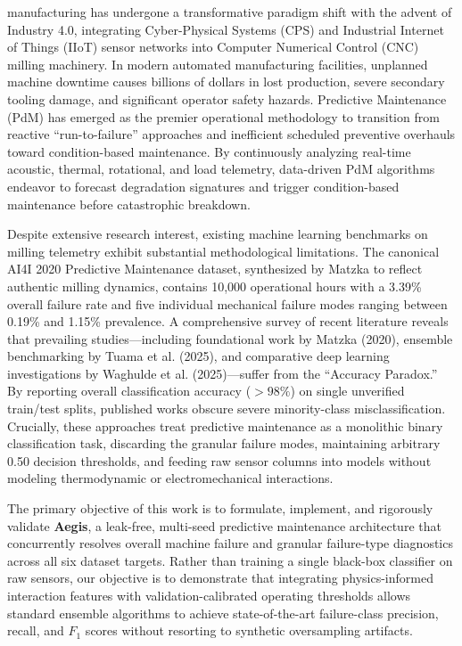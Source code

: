 \documentclass[conference]{IEEEtran}
\begin{document}
 manufacturing has undergone a transformative paradigm shift with the advent of Industry 4.0, integrating Cyber-Physical Systems (CPS) and Industrial Internet of Things (IIoT) sensor networks into Computer Numerical Control (CNC) milling machinery. In modern automated manufacturing facilities, unplanned machine downtime causes billions of dollars in lost production, severe secondary tooling damage, and significant operator safety hazards. Predictive Maintenance (PdM) has emerged as the premier operational methodology to transition from reactive ``run-to-failure'' approaches and inefficient scheduled preventive overhauls toward condition-based maintenance. By continuously analyzing real-time acoustic, thermal, rotational, and load telemetry, data-driven PdM algorithms endeavor to forecast degradation signatures and trigger condition-based maintenance before catastrophic breakdown.

Despite extensive research interest, existing machine learning benchmarks on milling telemetry exhibit substantial methodological limitations. The canonical AI4I 2020 Predictive Maintenance dataset, synthesized by Matzka to reflect authentic milling dynamics, contains 10,000 operational hours with a 3.39\% overall failure rate and five individual mechanical failure modes ranging between 0.19\% and 1.15\% prevalence. A comprehensive survey of recent literature reveals that prevailing studies—including foundational work by Matzka (2020), ensemble benchmarking by Tuama et al. (2025), and comparative deep learning investigations by Waghulde et al. (2025)—suffer from the ``Accuracy Paradox.'' By reporting overall classification accuracy ($>98\%$) on single unverified train/test splits, published works obscure severe minority-class misclassification. Crucially, these approaches treat predictive maintenance as a monolithic binary classification task, discarding the granular failure modes, maintaining arbitrary 0.50 decision thresholds, and feeding raw sensor columns into models without modeling thermodynamic or electromechanical interactions.

The primary objective of this work is to formulate, implement, and rigorously validate \textbf{Aegis}, a leak-free, multi-seed predictive maintenance architecture that concurrently resolves overall machine failure and granular failure-type diagnostics across all six dataset targets. Rather than training a single black-box classifier on raw sensors, our objective is to demonstrate that integrating physics-informed interaction features with validation-calibrated operating thresholds allows standard ensemble algorithms to achieve state-of-the-art failure-class precision, recall, and $F_1$ scores without resorting to synthetic oversampling artifacts.
\end{document}
